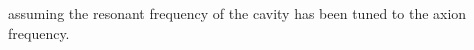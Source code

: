 \documentclass[aps,prl,twocolumn,groupedaddress]{revtex4-1}
\begin{document}

    assuming the resonant frequency of the cavity has been tuned to the axion frequency. 
\end{document}
